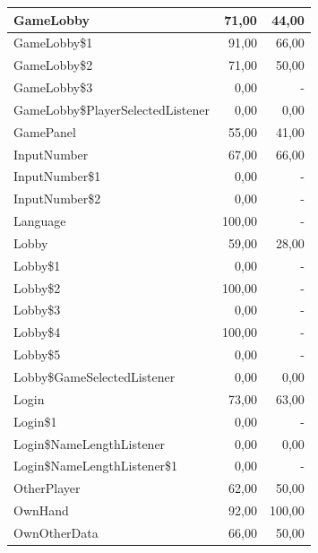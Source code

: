 \documentclass[a4paper]{article}
\begin{document}
\begin{tabular}{|l|r|r|}
GameLobby & 71,00 & \multicolumn{1}{r|}{44,00} \\ \hline
GameLobby\$1 & 91,00 & \multicolumn{1}{r|}{66,00} \\ \hline
GameLobby\$2 & 71,00 & \multicolumn{1}{r|}{50,00} \\ \hline
GameLobby\$3 & 0,00 & - \\ \hline
GameLobby\$PlayerSelectedListener & 0,00 & \multicolumn{1}{r|}{0,00} \\ \hline
GamePanel & 55,00 & \multicolumn{1}{r|}{41,00} \\ \hline
InputNumber & 67,00 & \multicolumn{1}{r|}{66,00} \\ \hline
InputNumber\$1 & 0,00 & - \\ \hline
InputNumber\$2 & 0,00 & - \\ \hline
Language & 100,00 & - \\ \hline
Lobby & 59,00 & \multicolumn{1}{r|}{28,00} \\ \hline
Lobby\$1 & 0,00 & - \\ \hline
Lobby\$2 & 100,00 & - \\ \hline
Lobby\$3 & 0,00 & - \\ \hline
Lobby\$4 & 100,00 & - \\ \hline
Lobby\$5 & 0,00 & - \\ \hline
Lobby\$GameSelectedListener & 0,00 & \multicolumn{1}{r|}{0,00} \\ \hline
Login & 73,00 & \multicolumn{1}{r|}{63,00} \\ \hline
Login\$1 & 0,00 & - \\ \hline
Login\$NameLengthListener & 0,00 & \multicolumn{1}{r|}{0,00} \\ \hline
Login\$NameLengthListener\$1 & 0,00 & - \\ \hline
OtherPlayer & 62,00 & \multicolumn{1}{r|}{50,00} \\ \hline
OwnHand & 92,00 & \multicolumn{1}{r|}{100,00} \\ \hline
OwnOtherData & 66,00 & \multicolumn{1}{r|}{50,00} \\ \hline
\end{tabular}
\end{document}
